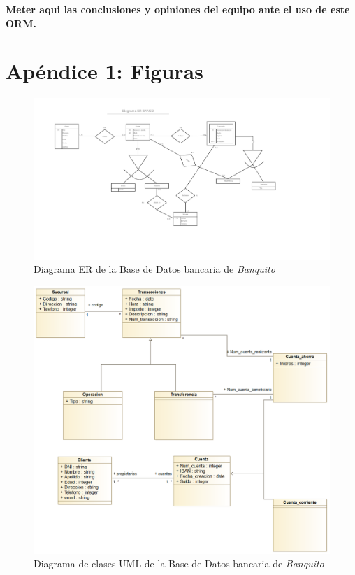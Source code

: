\documentclass[11pt,a4paper]{article}
\begin{document}
\textbf{Meter aqui las conclusiones y opiniones del equipo ante el uso de este ORM.}


\newpage
\section{Apéndice 1: Figuras}

\begin{landscape}
\begin{figure}
\centering
\includegraphics[scale=0.75]{images/diagramaer.png}
\caption{Diagrama ER de la Base de Datos bancaria de \emph{Banquito}}
\label{fig:diagramaer}
\end{figure}
\end{landscape}

\begin{figure}
\centering
\includegraphics[scale=0.45]{images/diagramauml.png}
\caption{Diagrama de clases UML de la Base de Datos bancaria de \emph{Banquito}}
\label{fig:diagramauml}
\end{figure}
\end{document}
